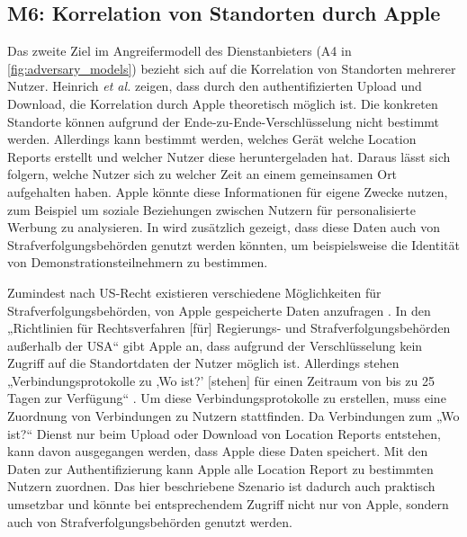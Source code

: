 \subsection[M6]{M6: Korrelation von Standorten durch Apple}
\label{missbrauch:6}

Das zweite Ziel im Angreifermodell des Dienstanbieters (A4 in \autoref{fig:adversary_models}) bezieht sich auf die Korrelation von Standorten mehrerer Nutzer.
Heinrich \textit{et al.} \cite{Heinrich_FindMy} zeigen, dass durch den authentifizierten Upload und Download, die Korrelation durch Apple theoretisch möglich ist.
Die konkreten Standorte können aufgrund der Ende-zu-Ende-Verschlüsselung nicht bestimmt werden.
Allerdings kann bestimmt werden, welches Gerät welche Location Reports erstellt und welcher Nutzer diese heruntergeladen hat.
Daraus lässt sich folgern, welche Nutzer sich zu welcher Zeit an einem gemeinsamen Ort aufgehalten haben.
Apple könnte diese Informationen für eigene Zwecke nutzen, zum Beispiel um soziale Beziehungen zwischen Nutzern für personalisierte Werbung zu analysieren.
In \cite{Heinrich_FindMy} wird zusätzlich gezeigt, dass diese Daten auch von Strafverfolgungsbehörden genutzt werden könnten, um beispielsweise die Identität von Demonstrationsteilnehmern zu bestimmen.

Zumindest nach US-Recht existieren verschiedene Möglichkeiten für Strafverfolgungsbehörden, von Apple gespeicherte Daten anzufragen \cite{Data_Access}.
In den „Richtlinien für Rechtsverfahren [für] Regierungs- und Strafverfolgungsbehörden außerhalb der USA“ \cite{Apple_FindMy_Data} gibt Apple an, dass aufgrund der Verschlüsselung kein Zugriff auf die Standortdaten der Nutzer möglich ist.
Allerdings stehen „Verbindungsprotokolle zu ‚Wo ist?’ [stehen] für einen Zeitraum von bis zu 25 Tagen zur Verfügung“ \cite{Apple_FindMy_Data}.
Um diese Verbindungsprotokolle zu erstellen, muss eine Zuordnung von Verbindungen zu Nutzern stattfinden.
Da Verbindungen zum „Wo ist?“ Dienst nur beim Upload oder Download von Location Reports entstehen, kann davon ausgegangen werden, dass Apple diese Daten speichert.
Mit den Daten zur Authentifizierung kann Apple alle Location Report zu bestimmten Nutzern zuordnen.
Das hier beschriebene Szenario ist dadurch auch praktisch umsetzbar und könnte bei entsprechendem Zugriff nicht nur von Apple, sondern auch von Strafverfolgungsbehörden genutzt werden.


